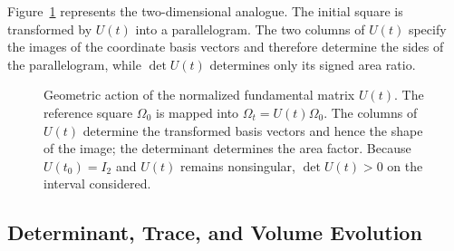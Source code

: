 \documentclass[11pt,a4paper]{article}
\theoremstyle{definition}
\numberwithin{equation}{section}
\begin{document}
Figure~\ref{fig:linear-deformation} represents the two-dimensional analogue. The initial square is transformed by $U(t)$ into a parallelogram. The two columns of $U(t)$ specify the images of the coordinate basis vectors and therefore determine the sides of the parallelogram, while $\det U(t)$ determines only its signed area ratio.

\begin{figure}[ht]
\centering
{}
\caption{Geometric action of the normalized fundamental matrix $U(t)$. The reference square $\Omega_0$ is mapped into $\Omega_t=U(t)\Omega_0$. The columns of $U(t)$ determine the transformed basis vectors and hence the shape of the image; the determinant determines the area factor. Because $U(t_0)=I_2$ and $U(t)$ remains nonsingular, $\det U(t)>0$ on the interval considered.}
\label{fig:linear-deformation}
\end{figure}

\subsection{Determinant, Trace, and Volume Evolution}
\end{document}
